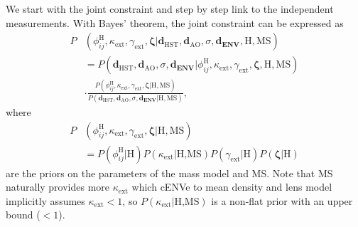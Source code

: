 \documentclass[useAMS,usenatbib]{mnras}
\begin{document}
We start with the joint constraint and step by step link to the independent measurements. With Bayes’ theorem, the joint constraint can be expressed as
\begin{equation}
\label{bayes}
\begin{split}
P&(\phi_{ij}^{\textrm{H}},\kappa_{\textrm{ext}},\gamma_{\textrm{ext}},\bm{\zeta}|\bm{d}_{\textrm{HST}},\bm{d}_{\textrm{AO}},\sigma, \bm{d_{\textrm{ENV}}},\textrm{H},\textrm{MS})\\
&=P(\bm{d}_{\textrm{HST}},\bm{d}_{\textrm{AO}},\sigma, \bm{d_{\textrm{ENV}}}|\phi_{ij}^{\textrm{H}},\kappa_{\textrm{ext}},\gamma_{\textrm{ext}},\bm{\zeta},\textrm{H},\textrm{MS})\\
&\cdot\frac{P(\phi_{ij}^{\textrm{H}},\kappa_{\textrm{ext}},\gamma_{\textrm{ext}},\bm{\zeta}|\textrm{H},\textrm{MS})}{P(\bm{d}_{\textrm{HST}},\bm{d}_{\textrm{AO}},\sigma, \bm{d_{\textrm{ENV}}}|\textrm{H},\textrm{MS})}, 
\end{split}
\end{equation}
where 
\begin{equation}
\begin{split}
P&(\phi_{ij}^{\textrm{H}},\kappa_{\textrm{ext}},\gamma_{\textrm{ext}},\bm{\zeta}|\textrm{H},\textrm{MS})\\
&=P(\phi_{ij}^{\textrm{H}}|\textrm{H})P(\kappa_{\textrm{ext}}|\textrm{H,MS})P(\gamma_{\textrm{ext}}|\textrm{H})P(\bm{\zeta}|\textrm{H})
\end{split}
\end{equation}
are the priors on the parameters of the mass model and MS. Note that MS naturally provides more $\kappa_{\textrm{ext}}$ which cENVe to mean density and lens model implicitly assumes $\kappa_{\textrm{ext}}<1$, so  $P(\kappa_{\textrm{ext}}|\textrm{H,MS})$ is a non-flat prior with an upper bound ($<1$).
\end{document}
